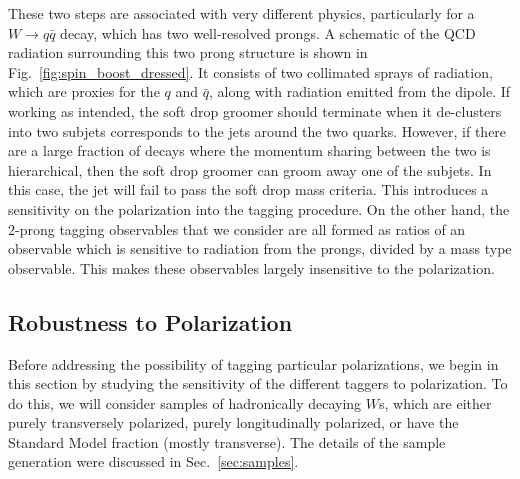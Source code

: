 \documentclass[11pt,letterpaper]{article}
\DeclareRobustCommand{\Sec}[1]{Sec.~\ref{#1}}
\DeclareRobustCommand{\Fig}[1]{Fig.~\ref{#1}}
\begin{document}
These two steps are associated with very different physics, particularly for a $W\to q\bar q$ decay, which has two well-resolved prongs.
%
A schematic of the QCD radiation surrounding this two prong structure is shown in \Fig{fig:spin_boost_dressed}.
%
It consists of two collimated sprays of radiation, which are proxies for the $q$ and $\bar q$, along with radiation emitted from the dipole.
%
If working as intended, the soft drop groomer should terminate when it de-clusters into two subjets corresponds to the jets around the two quarks.
%
However, if there are a large fraction of decays where the momentum sharing between the two is hierarchical, then the soft drop groomer can groom away one of the subjets.
%
In this case, the jet will fail to pass the soft drop mass criteria.
%
This introduces a sensitivity on the polarization into the tagging procedure.
%
On the other hand, the $2$-prong tagging observables that we consider are all formed as ratios of an observable which is sensitive to radiation from the prongs, divided by a mass type observable.
%
This makes these observables largely insensitive to the polarization.

\subsection{Robustness to Polarization}\label{sec:polar_robust}


Before addressing the possibility of tagging particular polarizations, we begin in this section by studying the sensitivity of the different taggers to polarization. To do this, we will consider samples of hadronically decaying $W$s, which are either purely transversely polarized, purely longitudinally polarized, or have the Standard Model fraction (mostly transverse). The details of the sample generation were discussed in \Sec{sec:samples}.
\end{document}
